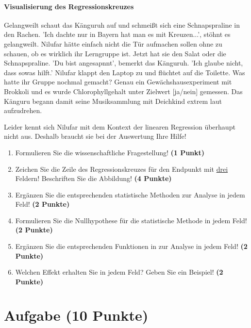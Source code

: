 \documentclass[a4paper, 9pt]{scrartcl}\usepackage[]{graphicx}\usepackage[]{xcolor}
\begin{document}
\ifcollection
\paragraph{Visualisierung des Regressionskreuzes}
\fi

Gelangweilt schaut das Känguruh auf und schmeißt sich eine Schnapspraline in den Rachen. 'Ich dachte nur in Bayern hat man es mit Kreuzen...', stöhnt es gelangweilt. Nilufar hätte einfach nicht die Tür aufmachen sollen ohne zu schauen, ob es wirklich ihr Lerngruppe ist. Jetzt hat sie den Salat oder die Schnapspraline. 'Du bist angesapnnt', bemerkt das Känguruh. 'Ich glaube nicht, dass sowas hilft.' Nilufar klappt den Laptop zu und flüchtet auf die Toilette. Was hatte ihr Gruppe nochmal gemacht? Genau ein Gewächshausexperiment mit Brokkoli und es wurde Chlorophyllgehalt unter Zielwert [ja/nein] gemessen. Das Känguru begann damit seine Musiksammlung mit Deichkind extrem laut aufzudrehen.

\vspace{1Ex}

Leider kennt sich Nilufar mit dem Kontext der linearen Regression überhaupt nicht aus. Deshalb braucht sie bei der Auswertung Ihre Hilfe!

\begin{enumerate}
  \item Formulieren Sie die wissenschaftliche Fragestellung! \textbf{(1 Punkt)}
\item Zeichen Sie die Zeile des Regressionskreuzes für den Endpunkt mit \underline{drei} Feldern! Beschriften Sie die Abbildung! \textbf{(4 Punkte)}
\item Ergänzen Sie die entsprechenden statistische Methoden zur Analyse in jedem Feld! \textbf{(2 Punkte)}
\item Formulieren Sie die Nullhypothese für die statistische Methode in jedem Feld! \textbf{(2 Punkte)}
\item Ergänzen Sie die entsprechenden Funktionen in \Rlogo zur Analyse in jedem Feld! \textbf{(2 Punkte)}
\item Welchen Effekt erhalten Sie in jedem Feld? Geben Sie ein Beispiel! \textbf{(2 Punkte)}
\end{enumerate} 
\clearpage

\section{Aufgabe \hfill (10 Punkte)}
\end{document}
